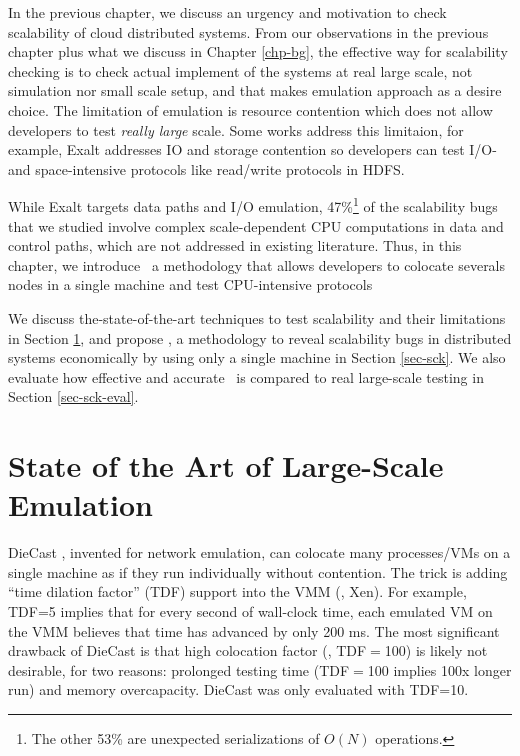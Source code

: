 
In the previous chapter, we discuss an urgency and motivation to check
scalability of cloud distributed systems. From our observations in the previous
chapter plus what we discuss in Chapter \ref{chp-bg}, the effective way for
scalability checking is to check actual implement of the systems at real large
scale, not simulation nor small scale setup, and that makes emulation approach
as a desire choice. The limitation of emulation is resource contention which
does not allow developers to test \textit{really large} scale. Some works
address this limitaion, for example, Exalt \cite{exalt} addresses IO and storage
contention so developers can test I/O- and space-intensive protocols like
read/write protocols in HDFS.

While Exalt targets data paths and I/O emulation, 47\%\footnote{The other 53\%
are unexpected serializations of $O(N)$ operations.} of the scalability bugs
that we studied involve complex scale-dependent CPU computations in data and
control paths, which are not addressed in existing literature. Thus, in this
chapter, we introduce \sck\, a methodology that allows developers to colocate
severals nodes in a single machine and test CPU-intensive protocols


We discuss the-state-of-the-art techniques to test scalability
and their limitations in Section \ref{mot-state}, and propose \sck, a
methodology to reveal scalability bugs in distributed systems economically by
using only a single machine in Section \ref{sec-sck}. We also evaluate how
effective and accurate \sck\ is compared to real large-scale testing in Section
\ref{sec-sck-eval}.

\section{State of the Art of Large-Scale Emulation}
\label{mot-state}


%
DieCast \cite{Gupta+08-DieCast}, invented for network emulation, can colocate
many processes/VMs on a single machine as if they run individually without
contention.  The trick is adding ``time dilation factor'' (TDF) support
\cite{Gupta+06-TimeDilation} into the VMM (\eg, Xen).
%
For example, TDF=5 implies that for every second of wall-clock time, each
emulated VM on the VMM believes that time has advanced by only 200 ms.
%
The most significant drawback of DieCast is that high colocation factor (\eg,
TDF$=$100) is likely not desirable, for two reasons: prolonged testing time
(TDF$=$100 implies 100x longer run) and memory overcapacity.  DieCast was only
evaluated with TDF=10.


